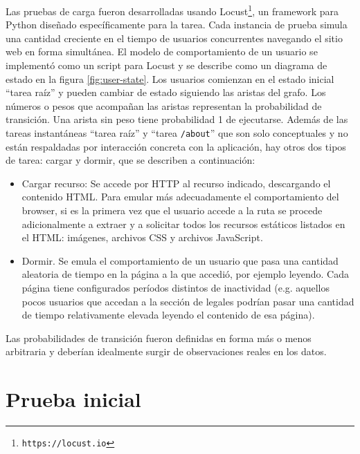 \documentclass[11pt]{scrartcl}
\begin{document}
Las pruebas de carga fueron desarrolladas usando Locust\footnote{\texttt{https://locust.io}}, un framework para Python diseñado específicamente para la tarea. Cada instancia de prueba simula una cantidad creciente en el tiempo de usuarios concurrentes navegando el sitio web en forma simultánea. El modelo de comportamiento de un usuario se implementó como un script para Locust y se describe como un diagrama de estado en la figura \ref{fig:user-state}. Los usuarios comienzan en el estado inicial ``tarea raíz'' y pueden cambiar de estado siguiendo las aristas del grafo. Los números o pesos que acompañan las aristas representan la probabilidad de transición. Una arista sin peso tiene probabilidad 1 de ejecutarse. Además de las tareas instantáneas ``tarea raíz'' y ``tarea \texttt{/about}'' que son solo conceptuales y no están respaldadas por interacción concreta con la aplicación, hay otros dos tipos de tarea: cargar y dormir, que se describen a continuación:

\begin{itemize}
\item Cargar recurso: Se accede por HTTP al recurso indicado, descargando el contenido HTML. Para emular más adecuadamente el comportamiento del browser, si es la primera vez que el usuario accede a la ruta se procede adicionalmente a extraer y a solicitar todos los recursos estáticos listados en el HTML: imágenes, archivos CSS y archivos JavaScript.
\item Dormir. Se emula el comportamiento de un usuario que pasa una cantidad aleatoria de tiempo en la página a la que accedió, por ejemplo leyendo. Cada página tiene configurados períodos distintos de inactividad (e.g. aquellos pocos usuarios que accedan a la sección de legales podrían pasar una cantidad de tiempo relativamente elevada leyendo el contenido de esa página).
\end{itemize}

Las probabilidades de transición fueron definidas en forma más o menos arbitraria y deberían idealmente surgir de observaciones reales en los datos.

\section{Prueba inicial}\label{sec:test-1}
\end{document}
